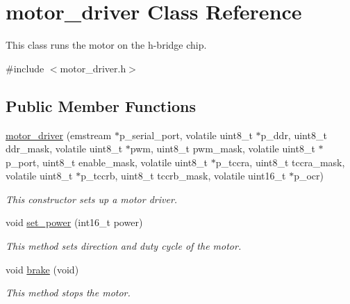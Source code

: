 \hypertarget{classmotor__driver}{\section{motor\-\_\-driver \-Class \-Reference}
\label{classmotor__driver}
}


\-This class runs the motor on the h-\/bridge chip.  




{\ttfamily \#include $<$motor\-\_\-driver.\-h$>$}

\subsection*{\-Public \-Member \-Functions}
\begin{DoxyCompactItemize}
\item 
\hyperlink{classmotor__driver_a8ae335815e1a1ef23904750562639346}{motor\-\_\-driver} (emstream $\ast$p\-\_\-serial\-\_\-port, volatile uint8\-\_\-t $\ast$p\-\_\-ddr, uint8\-\_\-t ddr\-\_\-mask, volatile uint8\-\_\-t $\ast$pwm, uint8\-\_\-t pwm\-\_\-mask, volatile uint8\-\_\-t $\ast$p\-\_\-port, uint8\-\_\-t enable\-\_\-mask, volatile uint8\-\_\-t $\ast$p\-\_\-tccra, uint8\-\_\-t tccra\-\_\-mask, volatile uint8\-\_\-t $\ast$p\-\_\-tccrb, uint8\-\_\-t tccrb\-\_\-mask, volatile uint16\-\_\-t $\ast$p\-\_\-ocr)
\begin{DoxyCompactList}\small\item\em \-This constructor sets up a motor driver. \end{DoxyCompactList}\item 
void \hyperlink{classmotor__driver_ae8f7bd6aa553abf071abcebc876a9e10}{set\-\_\-power} (int16\-\_\-t power)
\begin{DoxyCompactList}\small\item\em \-This method sets direction and duty cycle of the motor. \end{DoxyCompactList}\item 
void \hyperlink{classmotor__driver_aa21e7894053cd83968d9e6b2958c9aec}{brake} (void)
\begin{DoxyCompactList}\small\item\em \-This method stops the motor. \end{DoxyCompactList}\end{DoxyCompactItemize}
